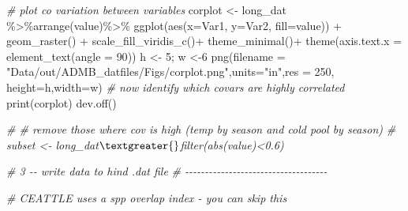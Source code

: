 \documentclass[
]{article}
\newenvironment{Shaded}{\begin{snugshade}}{\end{snugshade}}
\newcommand{\AttributeTok}[1]{\textcolor[rgb]{0.77,0.63,0.00}{#1}}
\newcommand{\CommentTok}[1]{\textcolor[rgb]{0.56,0.35,0.01}{\textit{#1}}}
\newcommand{\DecValTok}[1]{\textcolor[rgb]{0.00,0.00,0.81}{#1}}
\newcommand{\FunctionTok}[1]{\textcolor[rgb]{0.00,0.00,0.00}{#1}}
\newcommand{\NormalTok}[1]{#1}
\newcommand{\OtherTok}[1]{\textcolor[rgb]{0.56,0.35,0.01}{#1}}
\newcommand{\SpecialCharTok}[1]{\textcolor[rgb]{0.00,0.00,0.00}{#1}}
\newcommand{\StringTok}[1]{\textcolor[rgb]{0.31,0.60,0.02}{#1}}
\begin{document}
\begin{Shaded}
\begin{Highlighting}[]
      \CommentTok{\# plot co variation between variables}
\NormalTok{      corplot }\OtherTok{\textless{}{-}}\NormalTok{ long\_dat }\SpecialCharTok{\%\textgreater{}\%}\FunctionTok{arrange}\NormalTok{(value)}\SpecialCharTok{\%\textgreater{}\%}
                    \FunctionTok{ggplot}\NormalTok{(}\FunctionTok{aes}\NormalTok{(}\AttributeTok{x=}\NormalTok{Var1, }\AttributeTok{y=}\NormalTok{Var2, }\AttributeTok{fill=}\NormalTok{value)) }\SpecialCharTok{+} 
                    \FunctionTok{geom\_raster}\NormalTok{() }\SpecialCharTok{+} 
                    \FunctionTok{scale\_fill\_viridis\_c}\NormalTok{()}\SpecialCharTok{+}
                    \FunctionTok{theme\_minimal}\NormalTok{()}\SpecialCharTok{+}
                    \FunctionTok{theme}\NormalTok{(}\AttributeTok{axis.text.x =} \FunctionTok{element\_text}\NormalTok{(}\AttributeTok{angle =} \DecValTok{90}\NormalTok{))}
\NormalTok{        h }\OtherTok{\textless{}{-}} \DecValTok{5}\NormalTok{; w }\OtherTok{\textless{}{-}}\DecValTok{6}
      \FunctionTok{png}\NormalTok{(}\AttributeTok{filename =} \StringTok{"Data/out/ADMB\_datfiles/Figs/corplot.png"}\NormalTok{,}\AttributeTok{units=}\StringTok{"in"}\NormalTok{,}\AttributeTok{res =} \DecValTok{250}\NormalTok{, }\AttributeTok{height=}\NormalTok{h,}\AttributeTok{width=}\NormalTok{w)}
      \CommentTok{\# now identify which covars are highly correlated}
      \FunctionTok{print}\NormalTok{(corplot)}
      \FunctionTok{dev.off}\NormalTok{()}
      
      \CommentTok{\# \# remove those where cov is high (temp by season and cold pool by season)}
      \CommentTok{\# subset \textless{}{-} long\_dat$\textgreater{}$filter(abs(value)\textless{}0.6)}

   \CommentTok{\# 3 {-}{-} write data to hind .dat file}
   \CommentTok{\# {-}{-}{-}{-}{-}{-}{-}{-}{-}{-}{-}{-}{-}{-}{-}{-}{-}{-}{-}{-}{-}{-}{-}{-}{-}{-}{-}{-}{-}{-}{-}{-}{-}{-}{-}{-}}
      
         
      \CommentTok{\# CEATTLE uses a spp overlap index {-} you can skip this}
          

\end{Highlighting}
\end{Shaded}
\end{document}
